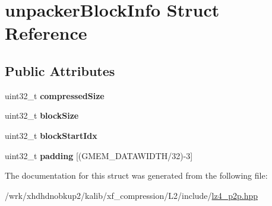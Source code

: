 \hypertarget{structunpackerBlockInfo}{\section{unpacker\-Block\-Info Struct Reference}
\label{structunpackerBlockInfo}
}
\subsection*{Public Attributes}
\begin{DoxyCompactItemize}
\item 
\hypertarget{structunpackerBlockInfo_a741d08923eefe7ae2979c3f511af6b57}{uint32\-\_\-t {\bfseries compressed\-Size}}\label{structunpackerBlockInfo_a741d08923eefe7ae2979c3f511af6b57}

\item 
\hypertarget{structunpackerBlockInfo_add12586bec0bc42280a57955c79836fc}{uint32\-\_\-t {\bfseries block\-Size}}\label{structunpackerBlockInfo_add12586bec0bc42280a57955c79836fc}

\item 
\hypertarget{structunpackerBlockInfo_ad1ff9bae24778d0633e2f0e6a47f1546}{uint32\-\_\-t {\bfseries block\-Start\-Idx}}\label{structunpackerBlockInfo_ad1ff9bae24778d0633e2f0e6a47f1546}

\item 
\hypertarget{structunpackerBlockInfo_a8898717738b6d1e46890f71340badd1d}{uint32\-\_\-t {\bfseries padding} \mbox{[}(G\-M\-E\-M\-\_\-\-D\-A\-T\-A\-W\-I\-D\-T\-H/32)-\/3\mbox{]}}\label{structunpackerBlockInfo_a8898717738b6d1e46890f71340badd1d}

\end{DoxyCompactItemize}


The documentation for this struct was generated from the following file\-:\begin{DoxyCompactItemize}
\item 
/wrk/xhdhdnobkup2/kalib/xf\-\_\-compression/\-L2/include/\hyperlink{lz4__p2p_8hpp}{lz4\-\_\-p2p.\-hpp}\end{DoxyCompactItemize}
